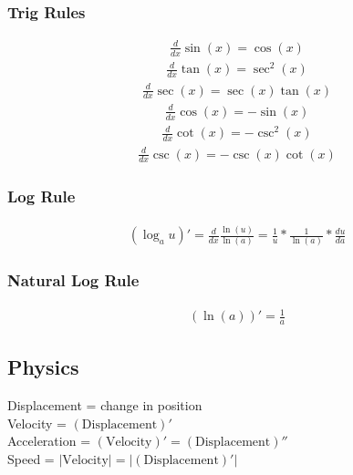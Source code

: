 \documentclass{article}
\newcommand\ddx{\frac{d}{dx}}
\newcommand\dd[2]{\frac{d{#1}}{d{#2}}}
\begin{document}
        \subsubsection{Trig Rules}
            \begin{multicols}{2}
                \begin{gather*}
                    \ddx\sin(x) = \cos(x)
                \end{gather*}
                \begin{gather*}
                    \ddx\tan(x) = \sec^2(x)
                \end{gather*}
                \begin{gather*}
                    \ddx\sec(x) = \sec(x)\tan(x)
                \end{gather*}
                \columnbreak
                \begin{gather*}
                   \ddx\cos(x) = -\sin(x)
                \end{gather*}
                \begin{gather*}
                    \ddx\cot(x) = -\csc^2(x)
                \end{gather*}
                \begin{gather*}
                    \ddx\csc(x) = -\csc(x)\cot(x)
                \end{gather*}
            \end{multicols}
        \subsubsection{Log Rule}
            \begin{gather*}
                (\log_au)' = \ddx\frac{\ln(u)}{\ln(a)} =  \frac{1}{u}*\frac{1}{\ln(a)}*\dd{u}{a}
            \end{gather*}
        \subsubsection{Natural Log Rule}
            \begin{gather*}
                \left(\ln(a)\right)' = \frac{1}{a}
            \end{gather*}
    \subsection{Physics}
        Displacement = change in position\\
        Velocity = \((\text{Displacement})'\)\\
        Acceleration = \((\text{Velocity})' = (\text{Displacement})''\)\\
        Speed = \(|\text{Velocity}| = \left|(\text{Displacement})'\right|\)
\end{document}
